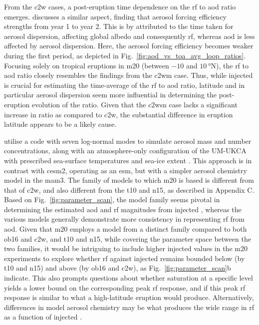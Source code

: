\documentclass{ametsocV6.1}
\newcommand{\iso}[1][i]{{#1}njected \ce{SO2}}
\begin{document}
From the \gls{c2w} cases, a post-eruption time dependence on the \gls{rf} to \gls{aod}
ratio emerges. \citet{marshall2020} discusses a similar aspect, finding that aerosol
forcing efficiency strengths from year 1 to year 2. This is by \citet{marshall2020}
attributed to the time taken for aerosol dispersion, affecting global albedo and
consequently \gls{rf}, whereas \gls{aod} is less affected by aerosol dispersion. Here,
the aerosol forcing efficiency becomes weaker during the first period, as depicted in
Fig.~\ref{fig:aod_vs_toa_avg_loop_ratios}. Focusing solely on tropical eruptions in
\gls{m20} (between \(-10\) and \(\SI{10}{\degree\mathrm{N}}\)), the \gls{rf} to
\gls{aod} ratio closely resembles the findings from the \gls{c2wm} case. Thus, while
\iso{} is crucial for estimating the time-average of the \gls{rf} to \gls{aod} ratio,
latitude and in particular aerosol dispersion seem more influential in determining the
post-eruption evolution of the ratio. Given that the \gls{c2wsn} case lacks a
significant increase in ratio as compared to \gls{c2w}, the substantial difference in
eruption latitude appears to be a likely cause.

\citet{marshall2019, marshall2020, marshall2021} utilise a code with seven log-normal
modes to simulate aerosol mass and number concentrations, along with an atmosphere-only
configuration of the UM-UKCA with prescribed sea-surface temperatures and sea-ice extent
\citep{marshall2019}. This approach is in contrast with \gls{cesm2}, operating as an
\gls{esm}, but with a simpler aerosol chemistry model in the \gls{mam3}. The family of
models to which \gls{m20} is based is different from that of \gls{c2w}, and also
different from the \gls{t10} and \gls{n15}, as described in Appendix C. Based on
Fig.~\ref{fig:parameter_scan}, the model family seems pivotal in determining the
estimated \gls{aod} and \gls{rf} magnitudes from \iso{}, whereas the various models
generally demonstrate more consistency in representing \gls{rf} from \gls{aod}. Given
that \gls{m20} employs a model from a distinct family compared to both \gls{ob16} and
\gls{c2w}, and \gls{t10} and \gls{n15}, while covering the parameter space between the
two families, it would be intriguing to include higher \iso{} values in the \gls{m20}
experiments to explore whether \gls{rf} against \iso{} remains bounded below (by
\gls{t10} and \gls{n15}) and above (by \gls{ob16} and \gls{c2w}), as
Fig.~\ref{fig:parameter_scan}b indicate. This also prompts questions about whether
 saturation at a specific level yields a lower bound on the corresponding peak
\gls{rf} response, and if this peak \gls{rf} response is similar to what a high-latitude
eruption would produce. Alternatively, differences in model aerosol chemistry may be
what produces the wide range in \gls{rf} as a function of \iso{}.
\end{document}
